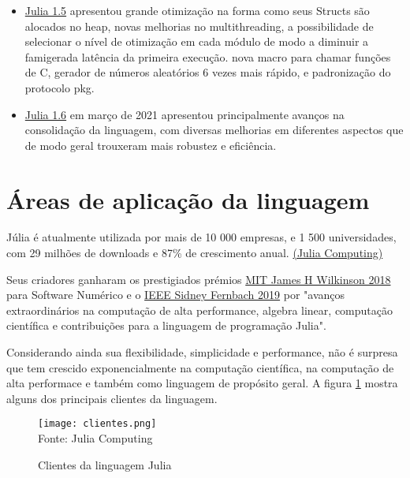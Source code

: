 \begin{itemize}
   \item\href{https://julialang.org/blog/2020/08/julia-1.5-highlights/}{Julia 1.5} apresentou grande otimização na forma como seus Structs são alocados no heap, novas melhorias no multithreading, a possibilidade de selecionar o nível de otimização em cada módulo de modo a diminuir a famigerada latência da primeira execução. nova macro para chamar funções de C, gerador de números aleatórios 6 vezes mais rápido, e padronização do protocolo pkg. 
   \item\href{https://julialang.org/blog/2021/03/julia-1.6-highlights/}{Julia 1.6} em março de 2021 apresentou principalmente avanços na consolidação da linguagem, com diversas melhorias em diferentes aspectos que de modo geral trouxeram mais robustez e eficiência. 
\end{itemize}


\section{Áreas de aplicação da linguagem}
Júlia é atualmente utilizada por mais de 10 000 empresas, e 1 500 universidades, com 29 milhões de downloads e 87\% de  crescimento anual. \href{https://juliacomputing.com/}{(Julia Computing)}

Seus criadores ganharam os prestigiados prémios \href{https://news.mit.edu/2018/julia-language-co-creators-win-james-wilkinson-prize-numerical-software-1226}{MIT James H Wilkinson 2018} para Software Numérico e o \href{[https://www.computer.org/press-room/2019-news/2019-ieee-fernbach-award-edelman](https://www.computer.org/press-room/2019-news/2019-ieee-fernbach-award-edelman)}{IEEE Sidney Fernbach 2019} por "avanços extraordinários na computação de alta performance, algebra linear, computação científica e contribuições para a linguagem de programação Julia". 

Considerando ainda sua flexibilidade, simplicidade e performance, não é surpresa que tem crescido exponencialmente na computação científica, na computação de alta performace e também como linguagem de propósito geral. A figura \ref{clientes} mostra alguns dos principais clientes da linguagem. \cite{Klok2021}
\begin{figure}[H]
   \begin{center}
       \caption{Clientes da linguagem Julia} \label{clientes}
       \texttt{[image: clientes.png]} \\
       {\tiny \sf Fonte: Julia Computing}
   \end{center}
  \end{figure}


